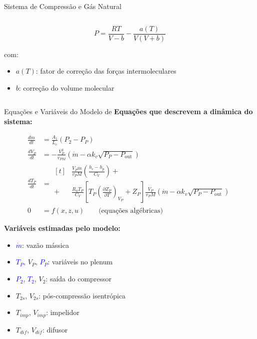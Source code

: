 \begin{frame}{Sistema de Compressão e Gás Natural}
\begin{columns}[T]
\begin{column}{0.52\textwidth}
            \[
            P = \frac{R T}{V - b} - \frac{a(T)}{V(V + b)}
            \]

            com:
            \begin{itemize}
                \item \( a(T) \): fator de correção das forças intermoleculares
                \item \( b \): correção do volume molecular
            \end{itemize}
        \end{column}
    \end{columns}
\end{frame}



\begin{frame}{Equações e Variáveis do Modelo de \cite{Meira2022} }
    \scriptsize
    \textbf{Equações que descrevem a dinâmica do sistema:}

    \begin{multicols}{2}
    \begin{align}
        \frac{d\dot{m}}{dt} &= \frac{A_1}{L_c}(P_2 - P_P) \tag{1} \\
        \frac{dV_P}{dt} &= -\frac{V_P^2}{v_{PM}} \left( \dot{m} - \alpha k_v \sqrt{P_P - P_{\text{out}}} \right) \tag{2} \\
        \frac{dT_P}{dt} &= 
        \begin{aligned}[t]
            &\frac{V_P \dot{m}}{v_P M} \left( \frac{h_c - h_p}{C_V} \right) + \\
            + &\frac{R_a T_P}{C_V} \left[ T_P \left( \frac{\partial Z_P}{\partial T} \right)_{V_P} + Z_P \right]
            \frac{V_P}{v_P M} \left( \dot{m} - \alpha k_v \sqrt{P_P - P_{\text{out}}} \right)
        \end{aligned} \tag{3} \\
            0 &= f(x, z, u) \tag{4} \qquad \text{(equações algébricas)}
    \end{align}


    \columnbreak
    \begin{minipage}{\linewidth}
        \textbf{Variáveis estimadas pelo modelo:}
        \begin{itemize}
            \item \textcolor{blue}{\( \dot{m} \)}: vazão mássica
            \item \textcolor{blue}{\( T_P \)}, \( V_P \), \textcolor{blue}{\( P_P \)}: variáveis no plenum
            \item \textcolor{blue}{\( P_2 \)}, \textcolor{blue}{\( T_2 \)}, \( V_2 \): saída do compressor
            \item \( T_{2s} \), \( V_{2s} \): pós-compressão isentrópica
            \item \( T_{imp} \), \( V_{imp} \): impelidor
            \item \( T_{dif} \), \( V_{dif} \): difusor
        \end{itemize}


\end{minipage}
\end{multicols}
\end{frame}
